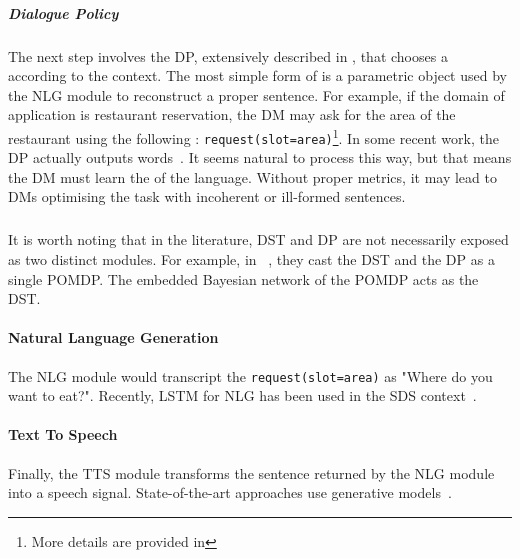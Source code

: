 \subparagraph{Dialogue Policy}
The next step involves the \gls{DP}, extensively described in , that chooses a ~\parencite{austin1962,searle1969} according to the  context. The most simple form of  is a parametric object used by the \gls{NLG} module to reconstruct a proper sentence. For example, if the domain of application is restaurant reservation, the \gls{DM} may ask for the area of the restaurant using the following : \texttt{request(slot=area)}\footnote{More details are provided in }. In some recent work, the \gls{DP} actually outputs words~\parencite{li2016-dialogue-act-as-word,Vries2017-GuessWhat}. It seems natural to process this way, but that means the \gls{DM} must learn the  of the language. Without proper metrics, it may lead to \glspl{DM} optimising the task with incoherent or ill-formed sentences.

\subparagraph{ }

It is worth noting that in the literature, \gls{DST} and \gls{DP} are not necessarily exposed as two distinct modules. For example, in ~\parencite{young2009-podmp-dst}, they cast the \gls{DST} and the \gls{DP} as a single \gls{POMDP}. The embedded Bayesian network of the \gls{POMDP} acts as the \gls{DST}.

\paragraph{Natural Language Generation}

The \gls{NLG} module would transcript the  \texttt{request(slot=area)} as "Where do you want to eat?". Recently, \gls{LSTM} for \gls{NLG} has been used in the \gls{SDS} context~\parencite{lstm-nlg}.

\paragraph{Text To Speech}

Finally, the \gls{TTS} module transforms the sentence returned by the \gls{NLG} module into a speech signal. State-of-the-art approaches use generative models~\parencite{wavenet,Wang2017-TacotronTE-tts,Oord2018ParallelWF}.

